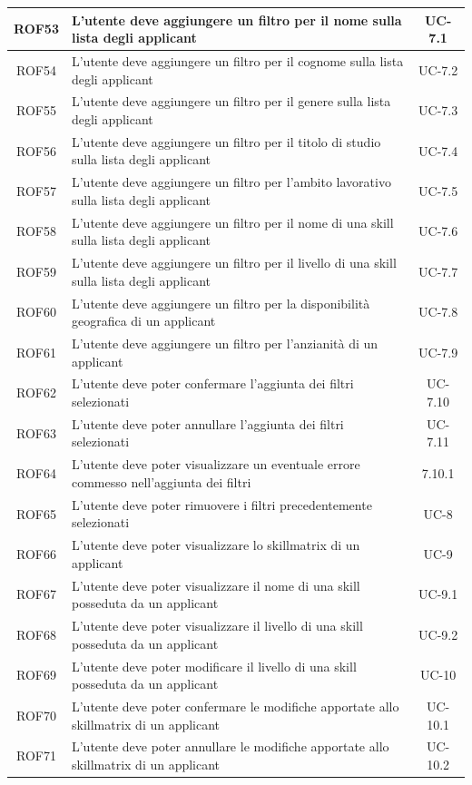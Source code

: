 \begin{center}
\begin{tabularx}{\textwidth}{|c|X|c|}
		\hline
		ROF53 & L'utente deve aggiungere un filtro per il nome sulla lista degli applicant & UC-7.1 \\
		\hline
		ROF54 & L'utente deve aggiungere un filtro per il cognome sulla lista degli applicant & UC-7.2\\
		\hline
		ROF55 & L'utente deve aggiungere un filtro per il genere sulla lista degli applicant & UC-7.3\\
		\hline
		ROF56 & L'utente deve aggiungere un filtro per il titolo di studio sulla lista degli applicant & UC-7.4 \\
		\hline
		ROF57 & L'utente deve aggiungere un filtro per l'ambito lavorativo sulla lista degli applicant & UC-7.5\\
		\hline
		ROF58 & L'utente deve aggiungere un filtro per il nome di una skill sulla lista degli applicant &  UC-7.6 \\
		\hline
		ROF59 & L'utente deve aggiungere un filtro per il livello di una skill sulla lista degli applicant & UC-7.7 \\
		\hline
		ROF60 & L'utente deve aggiungere un filtro per la disponibilità geografica di un applicant& UC-7.8\\
		\hline
		ROF61 & L'utente deve aggiungere un filtro per l'anzianità di un applicant& UC-7.9\\
		\hline
		ROF62 & L'utente deve poter confermare l'aggiunta dei filtri selezionati& UC-7.10\\
		\hline
		ROF63 & L'utente deve poter annullare l'aggiunta dei filtri selezionati& UC-7.11\\
		\hline
		ROF64 & L'utente deve poter visualizzare un eventuale errore commesso nell'aggiunta dei filtri & 7.10.1 \\
		\hline
		ROF65 & L'utente deve poter rimuovere i filtri precedentemente selezionati & UC-8\\
		\hline
		ROF66 & L'utente deve poter visualizzare lo skillmatrix di un applicant & UC-9\\
		\hline
		ROF67 & L'utente deve poter visualizzare il nome di una skill posseduta da un applicant & UC-9.1 \\
		\hline
		ROF68 & L'utente deve poter visualizzare il livello di una skill posseduta da un applicant & UC-9.2\\
		\hline
		ROF69 &L'utente deve poter modificare il livello di una skill posseduta da un applicant &  UC-10\\
		\hline
		ROF70 &  L'utente deve poter confermare le modifiche apportate allo skillmatrix di un applicant& UC-10.1\\
		\hline
		ROF71 & L'utente deve poter annullare le modifiche apportate allo skillmatrix di un applicant & UC-10.2 \\
		\hline
	\end{tabularx}
\end{center}


